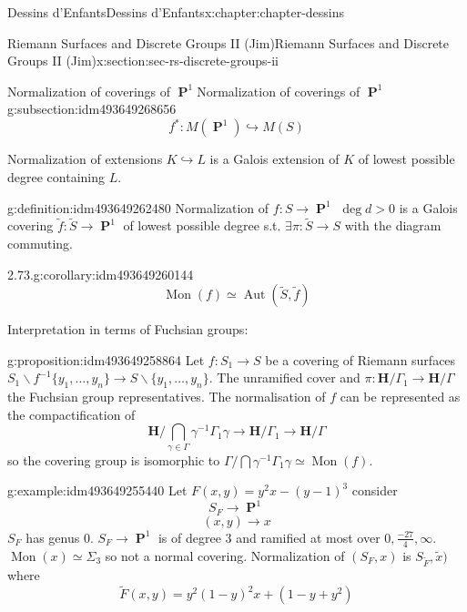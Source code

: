 \documentclass[oneside,10pt,]{book}
\numberwithin{equation}{section}
\newcommand{\inv}{^{-1}}
\newcommand{\HH}{\mathbf{H}}
\DeclareMathOperator{\PP}{\mathbf{P}}
\DeclareMathOperator{\Aut}{Aut}
\newcommand{\gt}{>}
\begin{document}
\begin{chapterptx}{Dessins d'Enfants}{}{Dessins d'Enfants}{}{}{x:chapter:chapter-dessins}
\begin{sectionptx}{Riemann Surfaces and Discrete Groups II (Jim)}{}{Riemann Surfaces and Discrete Groups II (Jim)}{}{}{x:section:sec-rs-discrete-groups-ii}
\begin{subsectionptx}{Normalization of coverings of \(\PP^1\)}{}{Normalization of coverings of \(\PP^1\)}{}{}{g:subsection:idm493649268656}
\begin{equation*}
f^* \colon M(\PP^1 ) \hookrightarrow M(S)
\end{equation*}
%
\par
Normalization of extensions \(K \hookrightarrow L\) is a Galois extension of \(K \) of lowest possible degree containing \(L\).%
\begin{definition}{}{g:definition:idm493649262480}%
Normalization of \(f\colon S\to \PP^1\) \(\deg d \gt 0 \) is a Galois covering \(\tilde f \colon \tilde S \to \PP^1 \) of  lowest possible degree s.t. \(\exists \pi \colon \tilde S \to S\) with  the diagram commuting.%
\end{definition}
\begin{corollary}{2.73.}{}{g:corollary:idm493649260144}%
%
\begin{equation*}
\operatorname{Mon}(f)  \simeq \Aut(\tilde S, \tilde f)
\end{equation*}
%
\end{corollary}
Interpretation in terms of Fuchsian groups:%
\begin{proposition}{}{}{g:proposition:idm493649258864}%
Let \(f\colon S_1 \to S\) be a covering of Riemann surfaces \(S_1\smallsetminus f\inv \{ y_1, \ldots, y_n \} \to S \smallsetminus\{ y_1, \ldots, y_n \}\). The unramified cover and \(\pi \colon \HH/ \Gamma_1 \to \HH/ \Gamma\) the Fuchsian group representatives. The normalisation of \(f\) can be represented as the compactification of%
\begin{equation*}
\HH/ \bigcap_{\gamma \in \Gamma} \gamma \inv \Gamma_1 \gamma \to \HH/\Gamma_1 \to \HH/\Gamma
\end{equation*}
so the covering group is isomorphic to \(\Gamma/ \bigcap \gamma \inv \Gamma_1 \gamma \simeq \operatorname{Mon}(f)\).%
\end{proposition}
\begin{example}{}{g:example:idm493649255440}%
Let \(F(x,y) = y^2x - (y-1)^3\) consider%
\begin{equation*}
S_F \to \PP^1
\end{equation*}
%
\begin{equation*}
(x,y) \to x
\end{equation*}
\(S_F\) has genus 0. \(S_F \to \PP^1\) is of degree 3 and ramified at most over \(0, \frac{-27}{4}, \infty\). \(\operatorname{Mon}(x)  \simeq \Sigma_3\) so not a normal covering. Normalization of \((S_F, x)\) is \(S_{\tilde F} , \tilde x)\) where%
\begin{equation*}
\tilde F (x,y) = y^2 ( 1-y)^2 x +  (1-y + y^2)

\end{equation*}
\end{example}
\end{subsectionptx}
\end{sectionptx}
\end{chapterptx}
\end{document}
